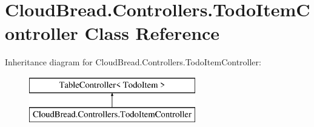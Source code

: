 \hypertarget{class_cloud_bread_1_1_controllers_1_1_todo_item_controller}{}\section{Cloud\+Bread.\+Controllers.\+Todo\+Item\+Controller Class Reference}
\label{class_cloud_bread_1_1_controllers_1_1_todo_item_controller}
Inheritance diagram for Cloud\+Bread.\+Controllers.\+Todo\+Item\+Controller\+:\begin{figure}[H]
\begin{center}
\leavevmode
\includegraphics[height=2.000000cm]{class_cloud_bread_1_1_controllers_1_1_todo_item_controller}
\end{center}
\end{figure}
